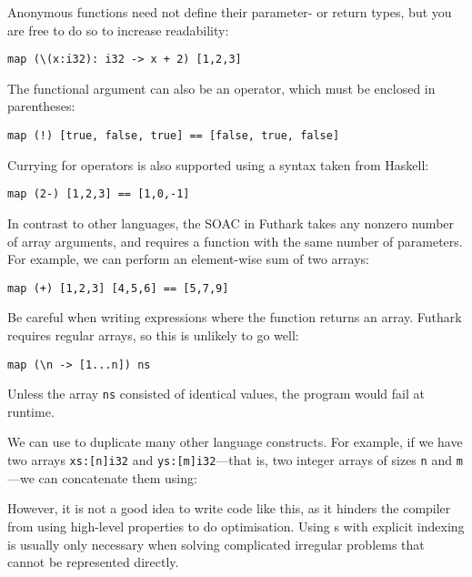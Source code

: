 \documentclass[oneside,11pt]{book}
\begin{document}
Anonymous functions need not define their parameter- or return types,
but you are free to do so to increase readability:

\begin{lstlisting}
map (\(x:i32): i32 -> x + 2) [1,2,3]
\end{lstlisting}

The functional argument can also be an operator, which must be
enclosed in parentheses:

\begin{lstlisting}
map (!) [true, false, true] == [false, true, false]
\end{lstlisting}

Currying for operators is also supported using a syntax taken from
Haskell:

\begin{lstlisting}
map (2-) [1,2,3] == [1,0,-1]
\end{lstlisting}

In contrast to other languages, the  SOAC in Futhark takes any
nonzero number of array arguments, and requires a function with the
same number of parameters.  For example, we can perform an
element-wise sum of two arrays:

\begin{lstlisting}
map (+) [1,2,3] [4,5,6] == [5,7,9]
\end{lstlisting}

Be careful when writing  expressions where the function
returns an array.  Futhark requires regular arrays, so this 
is unlikely to go well:

\begin{lstlisting}
map (\n -> [1...n]) ns
\end{lstlisting}

Unless the array \texttt{ns} consisted of identical values, the
program would fail at runtime.

We can use  to duplicate many other language constructs.  For
example, if we have two arrays \texttt{xs:[n]i32} and
\texttt{ys:[m]i32}---that is, two integer arrays of sizes \texttt{n}
and \texttt{m}---we can concatenate them using:



However, it is not a good idea to write code like this, as it hinders
the compiler from using high-level properties to do optimisation.
Using s with explicit indexing is usually only necessary when
solving complicated irregular problems that cannot be represented
directly.
\end{document}
